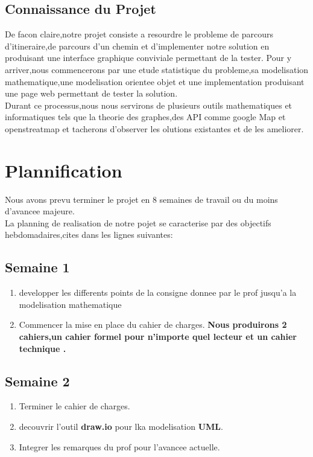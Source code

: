 \documentclass{article}
\begin{document}
\subsection{Connaissance du Projet}
De facon claire,notre projet consiste a resourdre le probleme de parcours d'itineraire,de parcours d'un chemin et d'implementer notre solution en produisant une interface graphique conviviale permettant de la tester.
Pour y arriver,nous commencerons par une etude statistique du probleme,sa modelisation mathematique,une modelisation orientee objet et une implementation produisant une page web permettant de tester la solution.\\
Durant ce processus,nous nous servirons de plusieurs outils mathematiques et informatiques tels que la theorie des graphes,des API comme google Map et openstreatmap et tacherons d'observer les olutions existantes et de les ameliorer.

\newpage
\section{Plannification}
Nous avons prevu terminer le projet en 8 semaines de travail ou du moins d'avancee majeure.\\
La planning de realisation de notre pojet se caracterise par des objectifs hebdomadaires,cites dans les lignes suivantes:

\subsection{Semaine 1}
\begin{enumerate}
    \item developper les differents points de la consigne donnee par le prof jusqu'a la modelisation mathematique
    
    \item Commencer la mise en place du cahier de charges.
    \textbf{Nous produirons 2 cahiers,un cahier formel pour n'importe quel lecteur et un cahier technique .}
    
\end{enumerate}




\subsection{Semaine 2}
\begin{enumerate}
    \item Terminer le cahier de charges.
    \item decouvrir l'outil \textbf{draw.io} pour lka modelisation \textbf{UML}.
    \item Integrer les remarques du prof pour l'avancee actuelle.
\end{enumerate}
\end{document}
